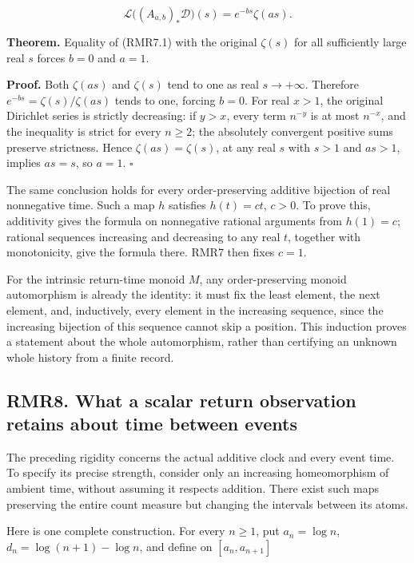 \[
\mathcal L\bigl((A_{a,b})_*\mathcal D\bigr)(s)
=e^{-bs}\zeta(as).
\tag{RMR7.1}
\]

\textbf{Theorem.} Equality of (RMR7.1) with the original \(\zeta(s)\)
for all sufficiently large real \(s\) forces \(b=0\) and \(a=1\).

\textbf{Proof.} Both \(\zeta(as)\) and \(\zeta(s)\) tend to one as real
\(s\to+\infty\). Therefore \(e^{-bs}=\zeta(s)/\zeta(as)\) tends to one,
forcing \(b=0\). For real \(x>1\), the original Dirichlet series is
strictly decreasing: if \(y>x\), every term \(n^{-y}\) is at most
\(n^{-x}\), and the inequality is strict for every \(n\ge2\); the
absolutely convergent positive sums preserve strictness. Hence
\(\zeta(as)=\zeta(s)\), at any real \(s\) with \(s>1\) and \(as>1\),
implies \(as=s\), so \(a=1\). \(\square\)

The same conclusion holds for every order-preserving additive bijection
of real nonnegative time. Such a map \(h\) satisfies \(h(t)=ct\),
\(c>0\). To prove this, additivity gives the formula on nonnegative
rational arguments from \(h(1)=c\); rational sequences increasing and
decreasing to any real \(t\), together with monotonicity, give the
formula there. RMR7 then fixes \(c=1\).

For the intrinsic return-time monoid \(M\), any order-preserving monoid
automorphism is already the identity: it must fix the least element, the
next element, and, inductively, every element in the increasing
sequence, since the increasing bijection of this sequence cannot skip a
position. This induction proves a statement about the whole
automorphism, rather than certifying an unknown whole history from a
finite record.

\subsection{RMR8. What a scalar return observation retains about time
between
events}\label{rmr8.-what-a-scalar-return-observation-retains-about-time-between-events}

The preceding rigidity concerns the actual additive clock and every
event time. To specify its precise strength, consider only an increasing
homeomorphism of ambient time, without assuming it respects addition.
There exist such maps preserving the entire count measure but changing
the intervals between its atoms.

Here is one complete construction. For every \(n\ge1\), put
\(a_n=\log n\), \(d_n=\log(n+1)-\log n\), and define on
\([a_n,a_{n+1}]\)

